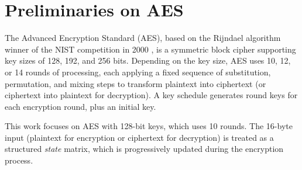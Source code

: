  
\section{Preliminaries on AES}
\label{hippogryph_preliminaries_aes}

The Advanced Encryption Standard (AES), based on the Rijndael algorithm winner of the NIST competition in 2000 \cite{aes-original}, is a symmetric block cipher supporting key sizes of 128, 192, and 256 bits. Depending on the key size, AES uses 10, 12, or 14 rounds of processing, each applying a fixed sequence of substitution, permutation, and mixing steps to transform plaintext into ciphertext (or ciphertext into plaintext for decryption). A key schedule generates round keys for each encryption round, plus an initial key.

This work focuses on AES with 128-bit keys, which uses 10 rounds. The 16-byte input (plaintext for encryption or ciphertext for decryption) is treated as a structured \textit{state} matrix, which is progressively updated during the encryption process.


